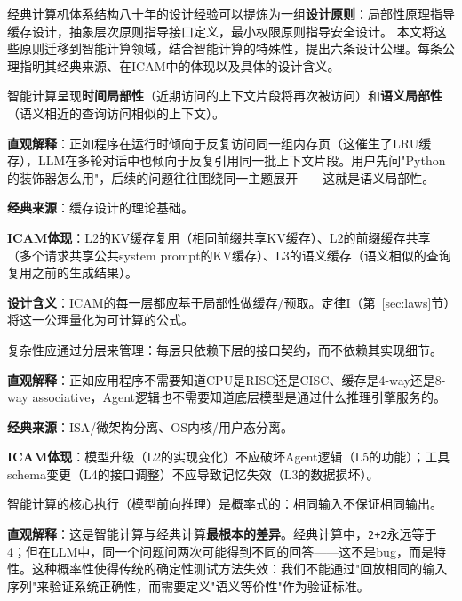 经典计算机体系结构八十年的设计经验可以提炼为一组\textbf{设计原则}：局部性原理指导缓存设计，抽象层次原则指导接口定义，最小权限原则指导安全设计。
本文将这些原则迁移到智能计算领域，结合智能计算的特殊性，提出六条设计公理。每条公理指明其经典来源、在ICAM中的体现以及具体的设计含义。

\begin{axiom}[局部性公理]
智能计算呈现\textbf{时间局部性}（近期访问的上下文片段将再次被访问）和\textbf{语义局部性}（语义相近的查询访问相似的上下文）。
\end{axiom}

\textbf{直观解释}：正如程序在运行时倾向于反复访问同一组内存页（这催生了LRU缓存），LLM在多轮对话中也倾向于反复引用同一批上下文片段。用户先问"Python的装饰器怎么用"，后续的问题往往围绕同一主题展开——这就是语义局部性。

\textbf{经典来源}：缓存设计的理论基础\cite{drepper2007memory}。

\textbf{ICAM体现}：L2的KV缓存复用（相同前缀共享KV缓存）、L2的前缀缓存共享（多个请求共享公共system prompt的KV缓存）、L3的语义缓存（语义相似的查询复用之前的生成结果）。

\textbf{设计含义}：ICAM的每一层都应基于局部性做缓存/预取。定律I（第~\ref{sec:laws}节）将这一公理量化为可计算的公式。

\begin{axiom}[分层抽象公理]
复杂性应通过分层来管理：每层只依赖下层的接口契约，而不依赖其实现细节。
\end{axiom}

\textbf{直观解释}：正如应用程序不需要知道CPU是RISC还是CISC、缓存是4-way还是8-way associative，Agent逻辑也不需要知道底层模型是通过什么推理引擎服务的。

\textbf{经典来源}：ISA/微架构分离、OS内核/用户态分离\cite{hennessy2017quantitative,ostep_2023}。

\textbf{ICAM体现}：模型升级（L2的实现变化）不应破坏Agent逻辑（L5的功能）；工具schema变更（L4的接口调整）不应导致记忆失效（L3的数据损坏）。

\begin{axiom}[概率执行公理]
智能计算的核心执行（模型前向推理）是概率式的：相同输入不保证相同输出。
\end{axiom}

\textbf{直观解释}：这是智能计算与经典计算\textbf{最根本的差异}。经典计算中，\texttt{2+2}永远等于4；但在LLM中，同一个问题问两次可能得到不同的回答——这不是bug，而是特性。这种概率性使得传统的确定性测试方法失效：我们不能通过"回放相同的输入序列"来验证系统正确性，而需要定义"语义等价性"作为验证标准。

